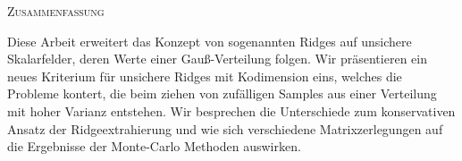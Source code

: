\begin{center}
  \textsc{Zusammenfassung}
\end{center}
%
\noindent
%
Diese Arbeit erweitert das Konzept von sogenannten Ridges auf unsichere
Skalarfelder, deren Werte einer Gauß-Verteilung folgen. Wir präsentieren
ein neues Kriterium für unsichere Ridges mit Kodimension eins, welches
die Probleme kontert, die beim ziehen von zufälligen Samples aus einer
Verteilung mit hoher Varianz entstehen. Wir besprechen die Unterschiede
zum konservativen Ansatz der Ridgeextrahierung und wie sich verschiedene
Matrixzerlegungen auf die Ergebnisse der Monte-Carlo Methoden auswirken.